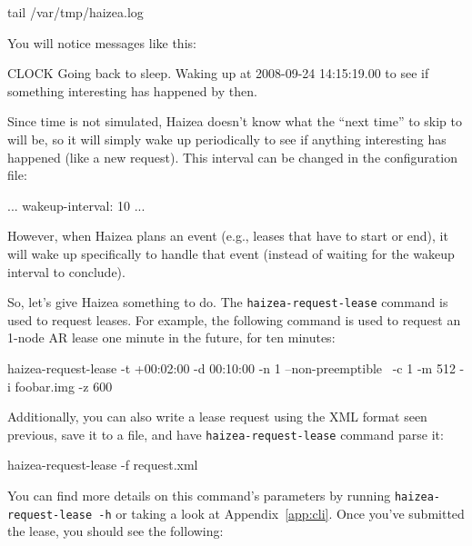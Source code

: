 \begin{shellverbatim}
tail /var/tmp/haizea.log
\end{shellverbatim}

You will notice messages like this:

\begin{wideshellverbatim}
[2008-09-24 14:14:18.58] CLOCK   Going back to sleep. 
                                 Waking up at 2008-09-24 14:15:19.00 
                                 to see if something interesting has 
                                 happened by then.
\end{wideshellverbatim}

Since time is not simulated, Haizea doesn't know what the ``next time'' to skip to will be, so it will simply wake up periodically to see if anything interesting has happened (like a new request). This interval can be changed in the configuration file:

\begin{wideshellverbatim}
[simulation]
...
wakeup-interval: 10
...
\end{wideshellverbatim}

However, when Haizea plans an event (e.g., leases that have to start or end), it will wake up specifically to handle that event (instead of waiting for the wakeup interval to conclude).

So, let's give Haizea something to do. The \texttt{haizea-request-lease} command is used to request leases. For example, the following command is used to request an 1-node AR lease one minute in the future, for ten minutes:

\begin{wideshellverbatim}
haizea-request-lease -t +00:02:00 -d 00:10:00 -n 1 --non-preemptible \
                     -c 1 -m 512 -i foobar.img -z 600 
\end{wideshellverbatim}

Additionally, you can also write a lease request using the XML format seen previous, save it to a file, and have \texttt{haizea-request-lease} command parse it:

\begin{wideshellverbatim}
haizea-request-lease -f request.xml
\end{wideshellverbatim}

You can find more details on this command's parameters by running \texttt{haizea-request-lease -h} or taking a look at Appendix~\ref{app:cli}. Once you've submitted the lease, you should see the following:

